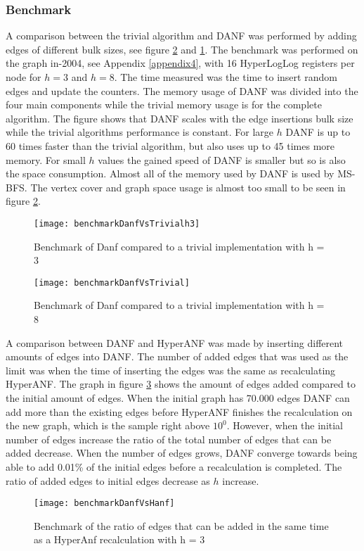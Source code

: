 \subsubsection{Benchmark}
A comparison between the trivial algorithm and DANF was performed by adding edges of different bulk sizes, see figure \ref{fig:benchmarkDanfVsTrivial} and \ref{fig:benchmarkDanfVsTrivialh3}. The benchmark was performed on the graph in-2004, see Appendix \ref{appendix4}, with 16 HyperLogLog registers per node for $h = 3$ and $h = 8$. The time measured was the time to insert random edges and update the counters. The memory usage of DANF was divided into the four main components while the trivial memory usage is for the complete algorithm. The figure shows that DANF scales with the edge insertions bulk size while the trivial algorithms performance is constant. For large $h$ DANF is up to 60 times faster than the trivial algorithm, but also uses up to 45 times more memory. For small $h$ values the gained speed of DANF is smaller but so is also the space consumption. Almost all of the memory used by DANF is used by MS-BFS. The vertex cover and graph space usage is almost too small to be seen in figure \ref{fig:benchmarkDanfVsTrivial}. 

\begin{figure}[h]
\centering
\texttt{[image: benchmarkDanfVsTrivialh3]}    
\captionsetup{justification=centering}
\caption {Benchmark of Danf compared to a trivial implementation with h = 3}
\label{fig:benchmarkDanfVsTrivialh3}
\end{figure}

\begin{figure}[h]
\centering
\texttt{[image: benchmarkDanfVsTrivial]}    
\captionsetup{justification=centering}
\caption {Benchmark of Danf compared to a trivial implementation with h = 8}
\label{fig:benchmarkDanfVsTrivial}
\end{figure}

A comparison between DANF and HyperANF was made by inserting different amounts of edges into DANF. The number of added edges that was used as the limit was when the time of inserting the edges was the same as recalculating HyperANF. The graph in figure \ref{fig:benchmarkDanfVsHanf} shows the amount of edges added compared to the initial amount of edges. When the initial graph has 70.000 edges DANF can add more than the existing edges before HyperANF finishes the recalculation on the new graph, which is the sample right above $10^0$. However, when the initial number of edges increase the ratio of the total number of edges that can be added decrease. When the number of edges grows, DANF converge towards being able to add 0.01\% of the initial edges before a recalculation is completed. The ratio of added edges to initial edges decrease as $h$ increase.

\begin{figure}[h]
\centering
\texttt{[image: benchmarkDanfVsHanf]}    
\captionsetup{justification=centering}
\caption {Benchmark of the ratio of edges that can be added in the same time as a HyperAnf recalculation with h = 3}
\label{fig:benchmarkDanfVsHanf}
\end{figure}






